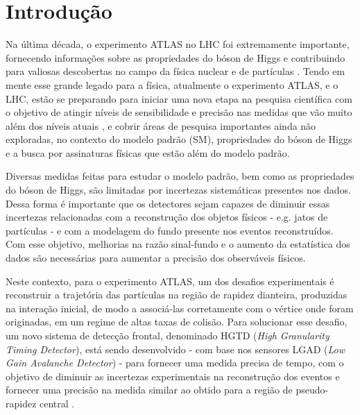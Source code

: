 \chapter{Introdução}

Na última década, o experimento ATLAS no LHC foi extremamente importante, fornecendo informações sobre as propriedades do bóson de Higgs e contribuindo para valiosas descobertas no campo da física nuclear e de partículas \cite{atlas_rev}. Tendo em mente esse grande legado para a física, atualmente o experimento ATLAS, e o LHC, estão se preparando para iniciar uma nova etapa na pesquisa científica com o objetivo de atingir níveis de sensibilidade e precisão nas medidas que vão muito além dos níveis atuais \cite{tdr}, e cobrir áreas de pesquisa importantes ainda não exploradas, no contexto do modelo padrão (SM), propriedades do bóson de Higgs e a busca por assinaturas físicas que estão além do modelo padrão.

Diversas medidas feitas para estudar o modelo padrão, bem como as propriedades do bóson de Higgs, são limitadas por incertezas sistemáticas presentes nos dados. Dessa forma é importante que os detectores sejam capazes de diminuir essas incertezas relacionadas com a reconstrução dos objetos físicos - e.g. jatos de partículas - e com a modelagem do fundo presente nos eventos reconstruídos. Com esse objetivo, melhorias na razão sinal-fundo e o aumento da estatística dos dados são necessárias para aumentar a precisão dos observáveis físicos. %

Neste contexto, para o experimento ATLAS, um dos desafios experimentais é reconstruir a trajetória das partículas na região de rapidez dianteira, produzidas na interação inicial, de modo a associá-las corretamente com o vértice onde foram originadas, em um regime de altas taxas de colisão. Para solucionar esse desafio, um novo sistema de detecção frontal, denominado HGTD ({\it High Granularity Timing Detector}), está sendo desenvolvido - com base nos sensores LGAD ({\it Low Gain Avalanche Detector}) - para fornecer uma medida precisa de tempo, com o objetivo de diminuir as incertezas experimentais na reconstrução dos eventos e fornecer uma precisão na medida similar ao obtido para a região de pseudo-rapidez central \cite{tdr}.

